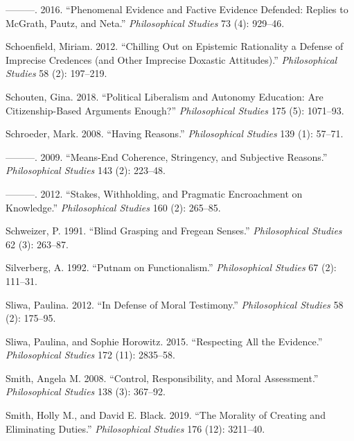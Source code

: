 \documentclass[
  10pt,
  letterpaper,
  DIV=11,
  numbers=noendperiod,
  twoside]{scrartcl}
\newlength{\cslhangindent}
\newenvironment{CSLReferences}[2] %
 {\begin{list}{}{%
  \setlength{\itemindent}{0pt}
  \setlength{\leftmargin}{0pt}
  \setlength{\parsep}{0pt}
  \ifodd #1
   \setlength{\leftmargin}{\cslhangindent}
   \setlength{\itemindent}{-1\cslhangindent}
  \fi
  \setlength{\itemsep}{#2\baselineskip}}}
 {\end{list}}
\begin{document}
\begin{CSLReferences}{1}{0}
---------. 2016. {``Phenomenal Evidence and Factive Evidence Defended:
Replies to McGrath, Pautz, and Neta.''} \emph{Philosophical Studies} 73
(4): 929--46.

Schoenfield, Miriam. 2012. {``Chilling Out on Epistemic Rationality a
Defense of Imprecise Credences (and Other Imprecise Doxastic
Attitudes).''} \emph{Philosophical Studies} 58 (2): 197--219.

Schouten, Gina. 2018. {``Political Liberalism and Autonomy Education:
Are Citizenship-Based Arguments Enough?''} \emph{Philosophical Studies}
175 (5): 1071--93.

Schroeder, Mark. 2008. {``Having Reasons.''} \emph{Philosophical
Studies} 139 (1): 57--71.

---------. 2009. {``Means-End Coherence, Stringency, and Subjective
Reasons.''} \emph{Philosophical Studies} 143 (2): 223--48.

---------. 2012. {``Stakes, Withholding, and Pragmatic Encroachment on
Knowledge.''} \emph{Philosophical Studies} 160 (2): 265--85.

Schweizer, P. 1991. {``Blind Grasping and Fregean Senses.''}
\emph{Philosophical Studies} 62 (3): 263--87.

Silverberg, A. 1992. {``Putnam on Functionalism.''} \emph{Philosophical
Studies} 67 (2): 111--31.

Sliwa, Paulina. 2012. {``In Defense of Moral Testimony.''}
\emph{Philosophical Studies} 58 (2): 175--95.

Sliwa, Paulina, and Sophie Horowitz. 2015. {``Respecting All the
Evidence.''} \emph{Philosophical Studies} 172 (11): 2835--58.

Smith, Angela M. 2008. {``Control, Responsibility, and Moral
Assessment.''} \emph{Philosophical Studies} 138 (3): 367--92.

Smith, Holly M., and David E. Black. 2019. {``The Morality of Creating
and Eliminating Duties.''} \emph{Philosophical Studies} 176 (12):
3211--40.


\end{CSLReferences}
\end{document}
